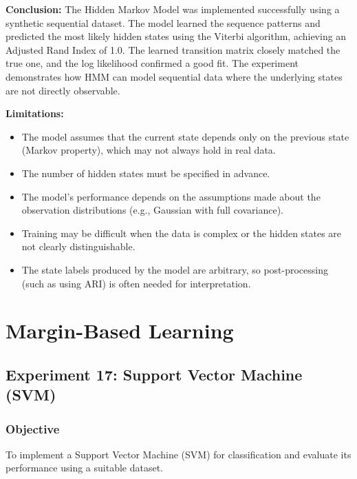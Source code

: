 \documentclass[a4paper,11pt]{article}
\begin{document}
\begin{itemize}
\textbf{Conclusion:} The Hidden Markov Model was implemented successfully using a synthetic sequential dataset. The model learned the sequence patterns and predicted the most likely hidden states using the Viterbi algorithm, achieving an Adjusted Rand Index of 1.0. The learned transition matrix closely matched the true one, and the log likelihood confirmed a good fit. The experiment demonstrates how HMM can model sequential data where the underlying states are not directly observable.

\textbf{Limitations:}
\begin{itemize}
    \item The model assumes that the current state depends only on the previous state (Markov property), which may not always hold in real data.
    \item The number of hidden states must be specified in advance.
    \item The model's performance depends on the assumptions made about the observation distributions (e.g., Gaussian with full covariance).
    \item Training may be difficult when the data is complex or the hidden states are not clearly distinguishable.
    \item The state labels produced by the model are arbitrary, so post-processing (such as using ARI) is often needed for interpretation.
\end{itemize}




\section{Margin-Based Learning}

\subsection{Experiment 17: Support Vector Machine (SVM)}

\subsubsection{Objective}
To implement a Support Vector Machine (SVM) for classification and evaluate its performance using a suitable dataset.


\end{itemize}
\end{document}

